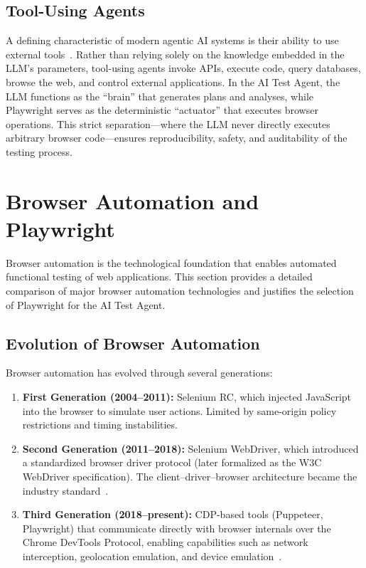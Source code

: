 \subsection{Tool-Using Agents}
\label{subsec:tool_agents}

A defining characteristic of modern agentic AI systems is their
ability to use external tools~\cite{wang2024survey}. Rather than
relying solely on the knowledge embedded in the LLM's parameters,
tool-using agents invoke APIs, execute code, query databases, browse
the web, and control external applications. In the AI Test Agent, the
LLM functions as the ``brain'' that generates plans and analyses,
while Playwright serves as the deterministic ``actuator'' that
executes browser operations. This strict separation---where the LLM
never directly executes arbitrary browser code---ensures
reproducibility, safety, and auditability of the testing process.

\section{Browser Automation and Playwright}
\label{sec:playwright_detail}

Browser automation is the technological foundation that enables
automated functional testing of web applications. This section provides
a detailed comparison of major browser automation technologies and
justifies the selection of Playwright for the AI Test Agent.

\subsection{Evolution of Browser Automation}
\label{subsec:browser_evolution}

Browser automation has evolved through several generations:

\begin{enumerate}[nosep]
  \item \textbf{First Generation (2004--2011):} Selenium RC, which
        injected JavaScript into the browser to simulate user actions.
        Limited by same-origin policy restrictions and timing
        instabilities.
  \item \textbf{Second Generation (2011--2018):} Selenium WebDriver,
        which introduced a standardized browser driver protocol (later
        formalized as the W3C WebDriver specification). The
        client--driver--browser architecture became the industry
        standard~\cite{selenium2004}.
  \item \textbf{Third Generation (2018--present):} CDP-based tools
        (Puppeteer, Playwright) that communicate directly with browser
        internals over the Chrome DevTools Protocol, enabling
        capabilities such as network interception, geolocation emulation,
        and device emulation~\cite{playwright2024}.
\end{enumerate}


